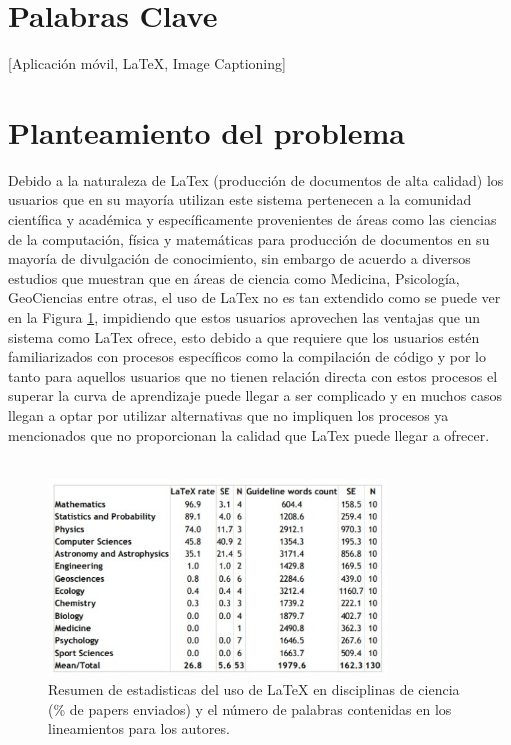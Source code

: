 \section{Palabras Clave}
[Aplicación móvil, LaTeX, Image Captioning] %
\section{Planteamiento del problema}


 Debido a la naturaleza de LaTex (producción de documentos de alta calidad) los usuarios que en su mayoría utilizan este sistema pertenecen a la comunidad científica y académica y específicamente provenientes de áreas como las ciencias de la computación, física y matemáticas para producción de documentos en su mayoría de divulgación de conocimiento, sin embargo de acuerdo a diversos estudios \cite{latexUsage} que muestran que en áreas de ciencia como Medicina, Psicología, GeoCiencias entre otras, el uso de LaTex no es tan extendido como se puede ver en la Figura \ref{fig:estadisticasUso}, impidiendo que estos usuarios aprovechen las ventajas que un sistema como LaTex ofrece, esto debido a que requiere que los usuarios estén familiarizados con procesos específicos como la compilación de código y por lo tanto para aquellos usuarios que no tienen relación directa con estos procesos el superar la curva de aprendizaje puede llegar a ser complicado y en muchos casos llegan a optar por utilizar alternativas que no impliquen los procesos ya mencionados que no proporcionan la calidad que LaTex puede llegar a ofrecer.
\\\\%

\begin{figure}
	\centering
	\includegraphics[width=0.8\textwidth]{capitulo1/images/estadisticasUso.png}
	\caption{Resumen de estadisticas del uso de LaTeX en disciplinas de ciencia (\% de papers enviados) y el número de palabras contenidas en los lineamientos para los autores.}
	\label{fig:estadisticasUso}
\end{figure}

